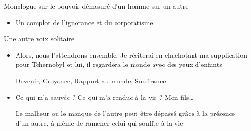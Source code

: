 \documentclass[french,a4paper,11pt,answers]{exam}
\newcommand{\cit}[2]{\og #1 \fg{} \begin{solution}{ #2 }\end{solution}} %
\begin{document}
    \begin{cadre}{Monologue sur le pouvoir démesuré d'un homme sur un autre}
	\begin{itemize}
	    \item \cit{Un complot de l'ignorance et du corporatisme.}
		{}
	\end{itemize}
    \end{cadre}

    \begin{cadre}{Une autre voix solitaire}
	\begin{itemize}
	    \item \cit{Alors, nous l'attendrons ensemble. Je réciterai en chuchotant ma supplication pour Tchernobyl et lui, il regardera le monde avec des yeux d'enfants}
		{Devenir, Croyance, Rapport au monde, Souffrance}
	    \item \cit{Ce qui m'a sauvée ? Ce qui m'a rendue à la vie ? Mon fils\dots}
		{Le malheur ou le manque de l'autre peut être dépassé grâce à la présence d'un autre, à même de ramener celui qui souffre à la vie}
	\end{itemize}
    \end{cadre}
\end{document}
